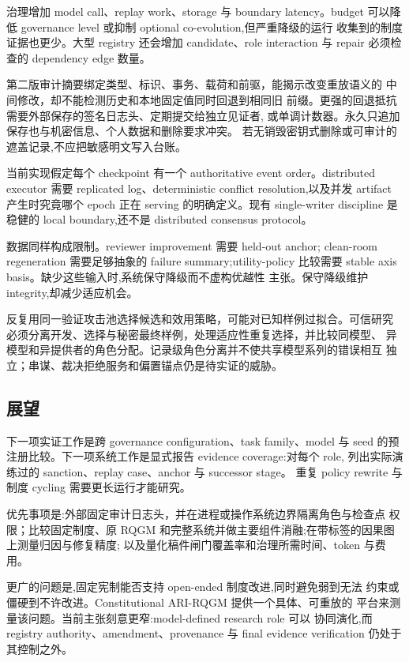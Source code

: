 治理增加 model call、replay work、storage 与 boundary latency。budget
可以降低 governance level 或抑制 optional co-evolution,但严重降级的运行
收集到的制度证据也更少。大型 registry 还会增加 candidate、role
interaction 与 repair 必须检查的 dependency edge 数量。

第二版审计摘要绑定类型、标识、事务、载荷和前驱，能揭示改变重放语义的
中间修改，却不能检测历史和本地固定值同时回退到相同旧
前缀。更强的回退抵抗需要外部保存的签名日志头、定期提交给独立见证者,
或单调计数器。永久只追加保存也与机密信息、个人数据和删除要求冲突。
若无销毁密钥式删除或可审计的遮盖记录,不应把敏感明文写入台账。

当前实现假定每个 checkpoint 有一个 authoritative event order。distributed
executor 需要 replicated log、deterministic conflict resolution,以及并发
artifact 产生时究竟哪个 epoch 正在 serving 的明确定义。现有
single-writer discipline 是稳健的 local boundary,还不是 distributed
consensus protocol。

数据同样构成限制。reviewer improvement 需要 held-out anchor;
clean-room regeneration 需要足够抽象的 failure summary;utility-policy
比较需要 stable axis basis。缺少这些输入时,系统保守降级而不虚构优越性
主张。保守降级维护 integrity,却减少适应机会。

反复用同一验证攻击池选择候选和效用策略，可能对已知样例过拟合。可信研究
必须分离开发、选择与秘密最终样例，处理适应性重复选择，并比较同模型、
异模型和异提供者的角色分配。记录级角色分离并不使共享模型系列的错误相互
独立；串谋、裁决拒绝服务和偏置锚点仍是待实证的威胁。

\subsection{展望}\label{sec:discussion:outlook}

下一项实证工作是跨 governance configuration、task family、model 与 seed
的预注册比较。下一项系统工作是显式报告 evidence coverage:对每个 role,
列出实际演练过的 sanction、replay case、anchor 与 successor stage。
重复 policy rewrite 与制度 cycling 需要更长运行才能研究。

优先事项是:外部固定审计日志头，并在进程或操作系统边界隔离角色与检查点
权限；比较固定制度、原
RQGM 和完整系统并做主要组件消融;在带标签的因果图上测量归因与修复精度;
以及量化稿件闸门覆盖率和治理所需时间、token 与费用。

更广的问题是,固定宪制能否支持 open-ended 制度改进,同时避免弱到无法
约束或僵硬到不许改进。Constitutional ARI-RQGM 提供一个具体、可重放的
平台来测量该问题。当前主张刻意更窄:model-defined research role 可以
协同演化,而 registry authority、amendment、provenance 与 final evidence
verification 仍处于其控制之外。
